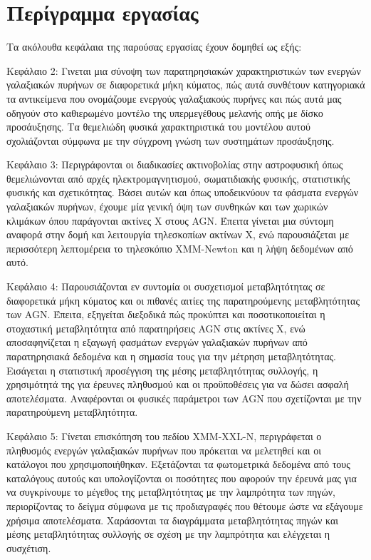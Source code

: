 \section{Περίγραμμα εργασίας}

Τα ακόλουθα κεφάλαια της παρούσας εργασίας έχουν δομηθεί ως εξής:

Κεφάλαιο 2: Γινεται μια σύνοψη των παρατηρησιακών χαρακτηριστικών των ενεργών γαλαξιακών πυρήνων σε διαφορετικά μήκη κύματος, πώς αυτά συνθέτουν κατηγοριακά τα αντικείμενα που ονομάζουμε ενεργούς γαλαξιακούς πυρήνες και πώς αυτά μας οδηγούν στο καθιερωμένο μοντέλο της υπερμεγέθους μελανής οπής με δίσκο προσάυξησης. Τα θεμελιώδη φυσικά χαρακτηριστικά του μοντέλου αυτού σχολιάζονται σύμφωνα με την σύγχρονη γνώση των συστημάτων προσάυξησης.

Κεφάλαιο 3: Περιγράφονται οι διαδικασίες ακτινοβολίας στην αστροφυσική όπως θεμελιώνονται από αρχές ηλεκτρομαγνητισμού, σωματιδιακής φυσικής, στατιστικής φυσικής και σχετικότητας. Βάσει αυτών και όπως υποδεικνύουν τα φάσματα ενεργών γαλαξιακών πυρήνων, έχουμε μία γενική όψη των συνθηκών και των χωρικών κλιμάκων όπου παράγονται ακτίνες Χ στους \textlatin{AGN}. Έπειτα γίνεται μια σύντομη αναφορά στην δομή και λειτουργία τηλεσκοπίων ακτίνων Χ, ενώ παρουσιάζεται με περισσότερη λεπτομέρεια το τηλεσκόπιο \textlatin{XMM-Newton} και η λήψη δεδομένων από αυτό.

Κεφάλαιο 4: Παρουσιάζονται εν συντομία οι συσχετισμοί μεταβλητότητας σε διαφορετικά μήκη κύματος και οι πιθανές αιτίες της παρατηρούμενης μεταβλητότητας των \textlatin{AGN}. Έπειτα, εξηγείται διεξοδικά πώς προκύπτει και ποσοτικοποιείται η στοχαστική μεταβλητότητα από παρατηρήσεις \textlatin{AGN} στις ακτίνες Χ, ενώ αποσαφηνίζεται η εξαγωγή φασμάτων ενεργών γαλαξιακών πυρήνων από παρατηρησιακά δεδομένα και η σημασία τους για την μέτρηση μεταβλητότητας. Εισάγεται η στατιστική προσέγγιση της μέσης μεταβλητότητας συλλογής, η χρησιμότητά της για έρευνες πληθυσμού και οι προϋποθέσεις για να δώσει ασφαλή αποτελέσματα. Αναφέρονται οι φυσικές παράμετροι των \textlatin{AGN} που σχετίζονται με την παρατηρούμενη μεταβλητότητα. 

Κεφάλαιο 5: Γίνεται επισκόπηση του πεδίου \textlatin{XMM-XXL-N}, περιγράφεται ο πληθυσμός ενεργών γαλαξιακών πυρήνων που πρόκειται να μελετηθεί και οι κατάλογοι που χρησιμοποιήθηκαν. Εξετάζονται τα φωτομετρικά δεδομένα από τους καταλόγους αυτούς και υπολογίζονται οι ποσότητες που αφορούν την έρευνά μας για να συγκρίνουμε το μέγεθος της μεταβλητότητας με την λαμπρότητα των πηγών, περιορίζοντας το δείγμα σύμφωνα με τις προδιαγραφές που θέτουμε ώστε να εξάγουμε χρήσιμα αποτελέσματα. Χαράσονται τα διαγράμματα μεταβλητότητας πηγών και μέσης μεταβλητότητας συλλογής σε σχέση με την λαμπρότητα και ελέγχεται η συσχέτιση.

